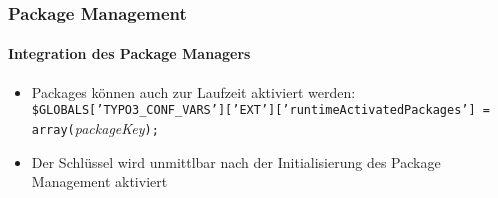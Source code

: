 \begin{frame}[fragile]
	\frametitle{Package Management}
	\framesubtitle{Integration des Package Managers}

	\lstset{
		basicstyle=\smaller\ttfamily
	}

	\begin{itemize}
		\item Packages können auch zur Laufzeit aktiviert werden:
			\smaller\texttt{\$GLOBALS['TYPO3\_CONF\_VARS']['EXT']['runtimeActivatedPackages'] = array(}\space\textit{packageKey}\space\texttt{);}\normalsize

		\item Der Schlüssel wird unmittlbar nach der Initialisierung des Package Management aktiviert
	\end{itemize}

\end{frame}


